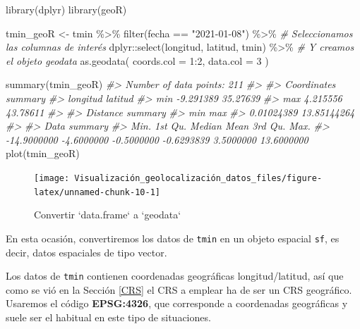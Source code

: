 \documentclass[
]{book}
\newenvironment{Shaded}{\begin{snugshade}}{\end{snugshade}}
\newcommand{\AttributeTok}[1]{\textcolor[rgb]{0.77,0.63,0.00}{#1}}
\newcommand{\CommentTok}[1]{\textcolor[rgb]{0.56,0.35,0.01}{\textit{#1}}}
\newcommand{\DecValTok}[1]{\textcolor[rgb]{0.00,0.00,0.81}{#1}}
\newcommand{\FunctionTok}[1]{\textcolor[rgb]{0.00,0.00,0.00}{#1}}
\newcommand{\NormalTok}[1]{#1}
\newcommand{\OtherTok}[1]{\textcolor[rgb]{0.56,0.35,0.01}{#1}}
\newcommand{\SpecialCharTok}[1]{\textcolor[rgb]{0.00,0.00,0.00}{#1}}
\newcommand{\StringTok}[1]{\textcolor[rgb]{0.31,0.60,0.02}{#1}}
\theoremstyle{definition}
\theoremstyle{definition}
\theoremstyle{definition}
\theoremstyle{definition}
\theoremstyle{remark}
\begin{document}
\begin{Shaded}
\begin{Highlighting}[]
\FunctionTok{library}\NormalTok{(dplyr)}
\FunctionTok{library}\NormalTok{(geoR)}

\NormalTok{tmin\_geoR }\OtherTok{\textless{}{-}}\NormalTok{ tmin }\SpecialCharTok{\%\textgreater{}\%}
  \FunctionTok{filter}\NormalTok{(fecha }\SpecialCharTok{==} \StringTok{"2021{-}01{-}08"}\NormalTok{) }\SpecialCharTok{\%\textgreater{}\%}
  \CommentTok{\# Seleccionamos las columnas de interés}
\NormalTok{  dplyr}\SpecialCharTok{::}\FunctionTok{select}\NormalTok{(longitud, latitud, tmin) }\SpecialCharTok{\%\textgreater{}\%}
  \CommentTok{\# Y creamos el objeto geodata}
  \FunctionTok{as.geodata}\NormalTok{(}
    \AttributeTok{coords.col =} \DecValTok{1}\SpecialCharTok{:}\DecValTok{2}\NormalTok{,}
    \AttributeTok{data.col =} \DecValTok{3}
\NormalTok{  )}


\FunctionTok{summary}\NormalTok{(tmin\_geoR)}
\CommentTok{\#\textgreater{} Number of data points: 211 }
\CommentTok{\#\textgreater{} }
\CommentTok{\#\textgreater{} Coordinates summary}
\CommentTok{\#\textgreater{}      longitud  latitud}
\CommentTok{\#\textgreater{} min {-}9.291389 35.27639}
\CommentTok{\#\textgreater{} max  4.215556 43.78611}
\CommentTok{\#\textgreater{} }
\CommentTok{\#\textgreater{} Distance summary}
\CommentTok{\#\textgreater{}         min         max }
\CommentTok{\#\textgreater{}  0.01024389 13.85144264 }
\CommentTok{\#\textgreater{} }
\CommentTok{\#\textgreater{} Data summary}
\CommentTok{\#\textgreater{}        Min.     1st Qu.      Median        Mean     3rd Qu.        Max. }
\CommentTok{\#\textgreater{} {-}14.9000000  {-}4.6000000  {-}0.5000000  {-}0.6293839   3.5000000  13.6000000}
\FunctionTok{plot}\NormalTok{(tmin\_geoR)}
\end{Highlighting}
\end{Shaded}

\begin{figure}

{\centering \texttt{[image: Visualización\_geolocalización\_datos\_files/figure-latex/unnamed-chunk-10-1]} 

}

\caption{Convertir `data.frame` a `geodata`}\label{fig:unnamed-chunk-10}
\end{figure}

En esta ocasión, convertiremos los datos de \texttt{tmin} en un objeto espacial \texttt{sf},
es decir, datos espaciales de tipo vector.

Los datos de \texttt{tmin} contienen coordenadas geográficas longitud/latitud, así que
como se vió en la Sección \ref{CRS} el CRS a emplear ha de ser un CRS
geográfico. Usaremos el código \textbf{EPSG:4326}, que corresponde a coordenadas
geográficas y suele ser el habitual en este tipo de situaciones.
\end{document}
